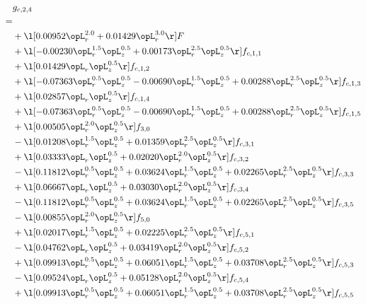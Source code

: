 \begin{alignat}{2} 
\label{eq:g_24_0} 
& g_{c,2,4} \nonumber \\ 
 = \\ 
& + \l[  0.00952 \opL_r^{2.0} +  0.01429 \opL_r^{3.0}  \r] F \nonumber \\ 
& + \l[  -0.00230 \opL_r^{1.5} \opL_z^{0.5} +  0.00173 \opL_r^{2.5} \opL_z^{0.5}  \r] f_{c,1,1} \nonumber \\ 
& + \l[  0.01429 \opL_r \opL_z^{0.5}  \r] f_{c,1,2} \nonumber \\ 
& + \l[  -0.07363 \opL_r^{0.5} \opL_z^{0.5}   -0.00690 \opL_r^{1.5} \opL_z^{0.5} +  0.00288 \opL_r^{2.5} \opL_z^{0.5}  \r] f_{c,1,3} \nonumber \\ 
& + \l[  0.02857 \opL_r \opL_z^{0.5}  \r] f_{c,1,4} \nonumber \\ 
& + \l[  -0.07363 \opL_r^{0.5} \opL_z^{0.5}   -0.00690 \opL_r^{1.5} \opL_z^{0.5} +  0.00288 \opL_r^{2.5} \opL_z^{0.5}  \r] f_{c,1,5} \nonumber \\ 
& + \l[  0.00505 \opL_r^{2.0} \opL_z^{0.5}  \r] f_{3,0} \nonumber \\ 
& - \l[  0.01208 \opL_r^{1.5} \opL_z^{0.5} +  0.01359 \opL_r^{2.5} \opL_z^{0.5}  \r] f_{c,3,1} \nonumber \\ 
& + \l[  0.03333 \opL_r \opL_z^{0.5} +  0.02020 \opL_r^{2.0} \opL_z^{0.5}  \r] f_{c,3,2} \nonumber \\ 
& - \l[  0.11812 \opL_r^{0.5} \opL_z^{0.5} +  0.03624 \opL_r^{1.5} \opL_z^{0.5} +  0.02265 \opL_r^{2.5} \opL_z^{0.5}  \r] f_{c,3,3} \nonumber \\ 
& + \l[  0.06667 \opL_r \opL_z^{0.5} +  0.03030 \opL_r^{2.0} \opL_z^{0.5}  \r] f_{c,3,4} \nonumber \\ 
& - \l[  0.11812 \opL_r^{0.5} \opL_z^{0.5} +  0.03624 \opL_r^{1.5} \opL_z^{0.5} +  0.02265 \opL_r^{2.5} \opL_z^{0.5}  \r] f_{c,3,5} \nonumber \\ 
& - \l[  0.00855 \opL_r^{2.0} \opL_z^{0.5}  \r] f_{5,0} \nonumber \\ 
& + \l[  0.02017 \opL_r^{1.5} \opL_z^{0.5} +  0.02225 \opL_r^{2.5} \opL_z^{0.5}  \r] f_{c,5,1} \nonumber \\ 
& - \l[  0.04762 \opL_r \opL_z^{0.5} +  0.03419 \opL_r^{2.0} \opL_z^{0.5}  \r] f_{c,5,2} \nonumber \\ 
& + \l[  0.09913 \opL_r^{0.5} \opL_z^{0.5} +  0.06051 \opL_r^{1.5} \opL_z^{0.5} +  0.03708 \opL_r^{2.5} \opL_z^{0.5}  \r] f_{c,5,3} \nonumber \\ 
& - \l[  0.09524 \opL_r \opL_z^{0.5} +  0.05128 \opL_r^{2.0} \opL_z^{0.5}  \r] f_{c,5,4} \nonumber \\ 
& + \l[  0.09913 \opL_r^{0.5} \opL_z^{0.5} +  0.06051 \opL_r^{1.5} \opL_z^{0.5} +  0.03708 \opL_r^{2.5} \opL_z^{0.5}  \r] f_{c,5,5} \nonumber \\ 
\end{alignat} 


